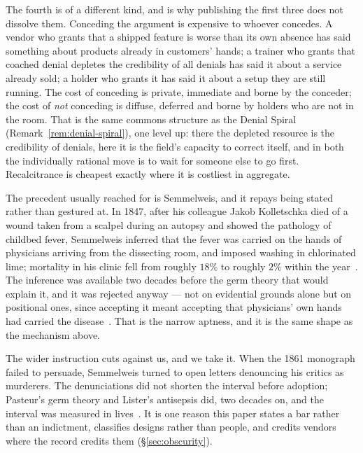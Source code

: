 \begin{remark}
The fourth is of a different kind, and is why publishing the first three does not
dissolve them. Conceding the argument is expensive to whoever concedes. A vendor who
grants that a shipped feature is worse than its own absence has said something about
products already in customers' hands; a trainer who grants that coached denial depletes
the credibility of all denials has said it about a service already sold; a holder who
grants it has said it about a setup they are still running. The cost of conceding is
private, immediate and borne by the conceder; the cost of \emph{not} conceding is
diffuse, deferred and borne by holders who are not in the room. That is the same
commons structure as the Denial Spiral (Remark~\ref{rem:denial-spiral}), one level up:
there the depleted resource is the credibility of denials, here it is the field's
capacity to correct itself, and in both the individually rational move is to wait for
someone else to go first. Recalcitrance is cheapest exactly where it is costliest in
aggregate.

The precedent usually reached for is Semmelweis, and it repays being stated rather than
gestured at. In 1847, after his colleague Jakob Kolletschka died of a wound taken from a
scalpel during an autopsy and showed the pathology of childbed fever, Semmelweis
inferred that the fever was carried on the hands of physicians arriving from the
dissecting room, and imposed washing in chlorinated lime; mortality in his clinic fell
from roughly $18\%$ to roughly $2\%$ within the year~\cite{semmelweis1861}. The
inference was available two decades before the germ theory that would explain it, and it
was rejected anyway --- not on evidential grounds alone but on positional ones, since
accepting it meant accepting that physicians' own hands had carried the
disease~\cite{carter-childbed}. That is the narrow aptness, and it is the same shape as
the mechanism above.

The wider instruction cuts against us, and we take it. When the 1861 monograph failed to
persuade, Semmelweis turned to open letters denouncing his critics as murderers. The
denunciations did not shorten the interval before adoption; Pasteur's germ theory and
Lister's antisepsis did, two decades on, and the interval was measured in
lives~\cite{carter-childbed}. It is one reason this paper states a bar rather than an
indictment, classifies designs rather than people, and credits vendors where the record
credits them (\S\ref{sec:obscurity}).


\end{remark}
